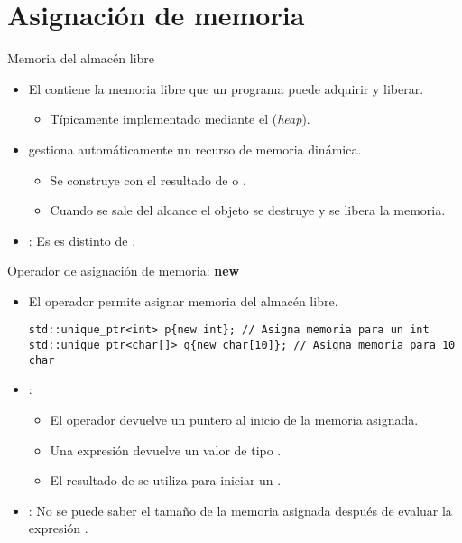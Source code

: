 \section{Asignación de memoria}

\begin{frame}[t]{Memoria del almacén libre}
\begin{itemize}
  \item El  contiene la memoria libre que un programa
        puede adquirir y liberar.
    \begin{itemize}
      \item Típicamente implementado mediante el  (\emph{heap}).
    \end{itemize}

  \item {} gestiona automáticamente un recurso de memoria
        dinámica.
    \begin{itemize}
      \item Se construye con el resultado de  o .
      \item Cuando se sale del alcance el objeto se destruye y se libera la memoria.
    \end{itemize}

  \item {}: Es es distinto de .
\end{itemize}
\end{frame}

\begin{frame}[t,fragile]{Operador de asignación de memoria: \textbf{new}}
\begin{itemize}
  \item El operador  permite asignar memoria del almacén libre.
\begin{lstlisting}
std::unique_ptr<int> p{new int}; // Asigna memoria para un int
std::unique_ptr<char[]> q{new char[10]}; // Asigna memoria para 10 char
\end{lstlisting}

  \item {}:
    \begin{itemize}
      \item El operador  devuelve un puntero al inicio de la memoria asignada.
      \item Una expresión   devuelve un valor de tipo .
      \item El resultado de  se utiliza para iniciar un .
    \end{itemize}

  \item {}: No se puede saber el tamaño de la memoria asignada 
        después de evaluar la expresión .
\end{itemize}
\end{frame}

